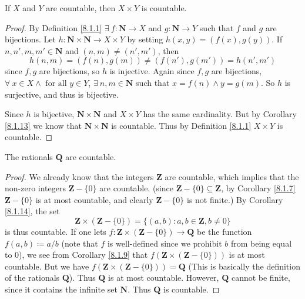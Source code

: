 \begin{corollary}\label{8.1.14}
    If \(X\) and \(Y\) are countable, then \(X \times Y\) is countable.
\end{corollary}

\begin{proof}
    By Definition \ref{8.1.1} \(\exists\ f : \mathbf{N} \to X\) and \(g : \mathbf{N} \to Y\) such that \(f\) and \(g\) are bijections.
    Let \(h : \mathbf{N} \times \mathbf{N} \to X \times Y\) by setting \(h(x, y) = (f(x), g(y))\).
    If \(n, n', m, m' \in \mathbf{N}\) and \((n, m) \neq (n', m')\), then
    \[
        h(n, m) = (f(n), g(m)) \neq (f(n'), g(m')) = h(n', m')
    \]
    since \(f, g\) are bijections, so \(h\) is injective.
    Again since \(f, g\) are bijections, \(\forall\ x \in X \land \text{ for all } y \in Y\), \(\exists\ n, m \in \mathbf{N}\) such that \(x = f(n) \land y = g(m)\).
    So \(h\) is surjective, and thus is bijective.

    Since \(h\) is bijective, \(\mathbf{N} \times \mathbf{N}\) and \(X \times Y\) has the same cardinality.
    But by Corollary \ref{8.1.13} we know that \(\mathbf{N} \times \mathbf{N}\) is countable.
    Thus by Definition \ref{8.1.1} \(X \times Y\) is countable.
\end{proof}

\begin{corollary}\label{8.1.15}
    The rationals \(\mathbf{Q}\) are countable.
\end{corollary}

\begin{proof}
    We already know that the integers \(\mathbf{Z}\) are countable, which implies that the non-zero integers \(\mathbf{Z} - \{0\}\) are countable.
    (since \(\mathbf{Z} - \{0\} \subseteq \mathbf{Z}\), by Corollary \ref{8.1.7} \(\mathbf{Z} - \{0\}\) is at most countable, and clearly \(\mathbf{Z} - \{0\}\) is not finite.)
    By Corollary \ref{8.1.14}, the set
    \[
        \mathbf{Z} \times (\mathbf{Z} - \{0\}) = \{(a, b) : a, b \in \mathbf{Z}, b \neq 0\}
    \]
    is thus countable.
    If one lets \(f : \mathbf{Z} \times (\mathbf{Z} - \{0\}) \to \mathbf{Q}\) be the function \(f(a, b) \coloneqq a / b\)
    (note that \(f\) is well-defined since we prohibit \(b\) from being equal to \(0\)), we see from Corollary \ref{8.1.9} that \(f(\mathbf{Z} \times (\mathbf{Z} - \{0\}))\) is at most countable.
    But we have \(f(\mathbf{Z} \times (\mathbf{Z} - \{0\})) = \mathbf{Q}\)
    (This is basically the definition of the rationals \(\mathbf{Q}\)).
    Thus \(\mathbf{Q}\) is at most countable.
    However, \(\mathbf{Q}\) cannot be finite, since it contains the infinite set \(\mathbf{N}\).
    Thus \(\mathbf{Q}\) is countable.
\end{proof}

